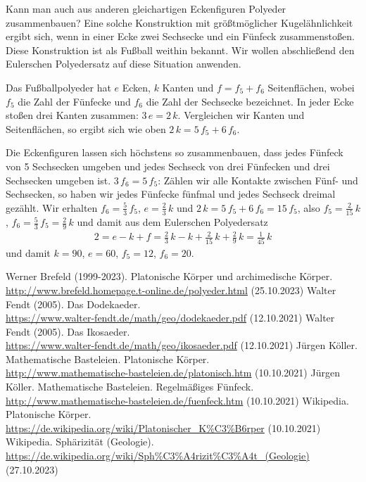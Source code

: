 \documentclass[11pt]{article}
\begin{document}
Kann man auch aus anderen gleichartigen Eckenfiguren Polyeder zusammenbauen?
Eine solche Konstruktion mit größtmöglicher Kugelähnlichkeit ergibt sich, wenn
in einer Ecke zwei Sechsecke und ein Fünfeck zusammenstoßen.  Diese
Konstruktion ist als Fußball weithin bekannt. Wir wollen abschließend den
Eulerschen Polyedersatz auf diese Situation anwenden.

Das Fußballpolyeder hat $e$ Ecken, $k$ Kanten und $f=f_5+f_6$ Seitenflächen,
wobei $f_5$ die Zahl der Fünfecke und $f_6$ die Zahl der Sechsecke bezeichnet.
In jeder Ecke stoßen drei Kanten zusammen: $3\,e=2\,k$.  Vergleichen wir
Kanten und Seitenflächen, so ergibt sich wie oben $2\,k=5\,f_5+6\,f_6$.

Die Eckenfiguren lassen sich höchstens so zusammenbauen, dass jedes Fünfeck
von 5 Sechsecken umgeben und jedes Sechseck von drei Fünfecken und drei
Sechsecken umgeben ist.  $3\,f_6=5\,f_5$: Zählen wir alle Kontakte zwischen
Fünf- und Sechsecken, so haben wir jedes Fünfecke fünfmal und jedes Sechseck
dreimal gezählt.  Wir erhalten $f_6=\frac53\,f_5$, $e=\frac23\,k$ und
$2\,k=5\,f_5+6\,f_6=15\,f_5$, also $f_5=\frac{2}{15}\,k$,
$f_6=\frac53\,f_5=\frac{2}{9}\,k$ und damit aus dem Eulerschen Polyedersatz
\begin{gather*}
  2=e-k+f=\frac23\,k-k+\frac{2}{15}\,k+\frac{2}{9}\,k=\frac{1}{45}\,k
\end{gather*}
und damit $k=90$, $e=60$, $f_5=12$, $f_6=20$. 


\begin{thebibliography}{xxx}
 Werner Brefeld (1999-2023). Platonische Körper und
  archimedische Körper.\\
  \url{http://www.brefeld.homepage.t-online.de/polyeder.html} (25.10.2023) 
 Walter Fendt (2005). Das Dodekaeder.\\
  \url{https://www.walter-fendt.de/math/geo/dodekaeder.pdf} (12.10.2021) 
 Walter Fendt (2005). Das Ikosaeder.\\
  \url{https://www.walter-fendt.de/math/geo/ikosaeder.pdf} (12.10.2021) 
 Jürgen Köller. Mathematische Basteleien.
  Platonische Körper.\\
  \url{http://www.mathematische-basteleien.de/platonisch.htm} (10.10.2021)
 Jürgen Köller. Mathematische Basteleien.
  Regelmäßiges Fünfeck.\\
  \url{http://www.mathematische-basteleien.de/fuenfeck.htm} (10.10.2021)
 Wikipedia. Platonische Körper.\\ 
  \url{https://de.wikipedia.org/wiki/Platonischer_K%C3%B6rper} (10.10.2021)
 Wikipedia. Sphärizität (Geologie).\\ 
  \url{https://de.wikipedia.org/wiki/Sph%C3%A4rizit%C3%A4t_(Geologie)}\\
    (27.10.2023)
\end{thebibliography}
\end{document}
